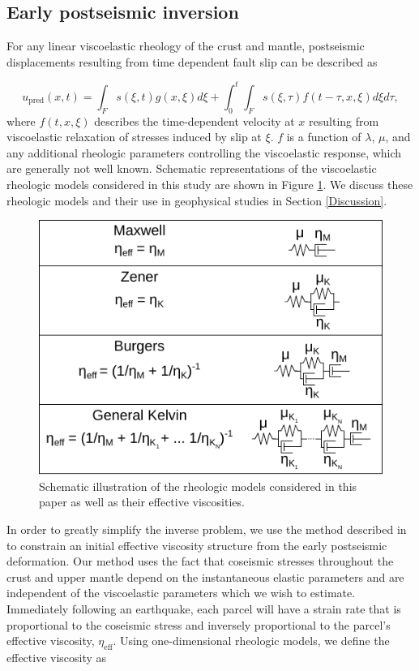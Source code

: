 \subsection{Early postseismic inversion}\label{ch3:sec:InitialInversion}
For any linear viscoelastic rheology of the crust and mantle, postseismic displacements resulting from time dependent fault slip can be described as  

\begin{equation}\label{GeneralForward}
  u_\mathrm{pred}(x,t) = \int_F s(\xi,t)g(x,\xi)d\xi + 
           \int_0^t\int_F s(\xi,\tau) f(t-\tau,x,\xi) d\xi d\tau,
\end{equation}
where $f(t,x,\xi)$ describes the time-dependent velocity at $x$ resulting from viscoelastic relaxation of stresses induced by slip at $\xi$. $f$ is a function of $\lambda$, $\mu$, and any additional rheologic parameters controlling the viscoelastic response, which are generally not well known. Schematic representations of the viscoelastic rheologic models considered in this study are shown in Figure \ref{ch3:fig:Rheology}.  We discuss these rheologic models and their use in geophysical studies in Section \ref{Discussion}. 

\begin{figure}\label{ch3:fig:Rheology}
\includegraphics[scale=1.0]{ch3/figures/2016jb013114-f08}
\caption{Schematic illustration of the rheologic models considered in this paper as well as their effective viscosities.}
\end{figure}

In order to greatly simplify the inverse problem, we use the method described in \citet{Hines2016} to constrain an initial effective viscosity structure from the early postseismic deformation.  Our method uses the fact that coseismic stresses throughout the crust and upper mantle depend on the instantaneous elastic parameters and are independent of the viscoelastic parameters which we wish to estimate. Immediately following an earthquake, each parcel will have a strain rate that is proportional to the coseismic stress and inversely proportional to the parcel's effective viscosity, $\eta_\mathrm{eff}$.  Using one-dimensional rheologic models, we define the effective viscosity as

